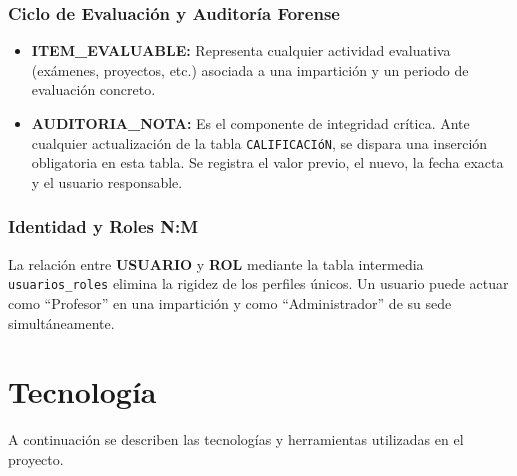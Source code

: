 \documentclass[12pt, a4paper]{report}
\begin{document}
\subsection{Ciclo de Evaluación y Auditoría Forense}
\begin{itemize}
  \item \textbf{ITEM\_EVALUABLE:} Representa cualquier actividad evaluativa (exámenes, proyectos, etc.) asociada a una impartición y un periodo de evaluación concreto.
  \item \textbf{AUDITORIA\_NOTA:} Es el componente de integridad crítica. Ante cualquier actualización de la tabla \texttt{CALIFICACIóN}, se dispara una inserción obligatoria en esta tabla. Se registra el valor previo, el nuevo, la fecha exacta y el usuario responsable.
\end{itemize}

\subsection{Identidad y Roles N:M}

La relación entre \textbf{USUARIO} y \textbf{ROL} mediante la tabla intermedia \texttt{usuarios\_roles} elimina la rigidez de los perfiles únicos. Un usuario puede actuar como ``Profesor'' en una impartición y como ``Administrador'' de su sede simultáneamente.

\chapter{Tecnología}

A continuación se describen las tecnologías y herramientas utilizadas en el proyecto.
\end{document}
